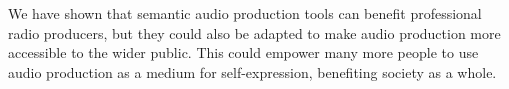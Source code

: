 


We have shown that semantic audio production tools can benefit professional radio producers, but they could also be
adapted to make audio production more accessible to the wider public. This could empower many more people to 
use audio production as a medium for self-expression, benefiting society as a whole.

